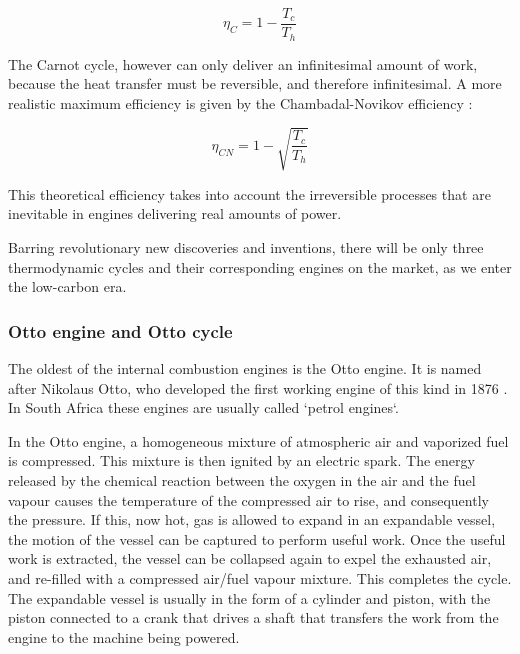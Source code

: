 \begin{equation}
	\eta_{C} = 1 - \frac{T_c}{T_h}
\label{eqn:Carnot}
\end{equation}

The Carnot cycle, however can only deliver an infinitesimal amount of work,
because the heat transfer must be reversible, and therefore infinitesimal. A
more realistic maximum efficiency is given by the Chambadal-Novikov efficiency
\autocite{Hoffmann2008}:

\begin{equation}
	\eta_{CN} = 1 - \sqrt{\frac{T_c}{T_h}}
\label{eqn:Chambadal-Novikov}
\end{equation}

This theoretical efficiency takes into account the irreversible processes that
are inevitable in engines delivering real amounts of power.

Barring revolutionary new discoveries and inventions, there will be only three
thermodynamic cycles and their corresponding engines on the market, as we enter
the low-carbon era.

\subsubsection{Otto engine and Otto cycle}

The oldest of the internal combustion engines is the Otto engine. It is named
after Nikolaus Otto, who developed the first working engine of this kind in 1876
\autocite[Chapter 9]{Cummins1989}. In South Africa these engines are usually
called `petrol engines`.

In the Otto engine, a homogeneous mixture of atmospheric air and vaporized fuel
is compressed. This mixture is then ignited by an electric spark. The energy
released by the chemical reaction between the oxygen in the air and the fuel
vapour causes the temperature of the compressed air to rise, and consequently
the pressure. If this, now hot, gas is allowed to expand in an expandable
vessel, the motion of the vessel can be captured to perform useful work. Once
the useful work is extracted, the vessel can be collapsed again to expel the
exhausted air, and re-filled with a compressed air/fuel vapour mixture. This completes
the cycle. The expandable vessel is usually in the form of a cylinder and
piston, with the piston connected to a crank that drives a shaft that transfers
the work from the engine to the machine being powered. 

